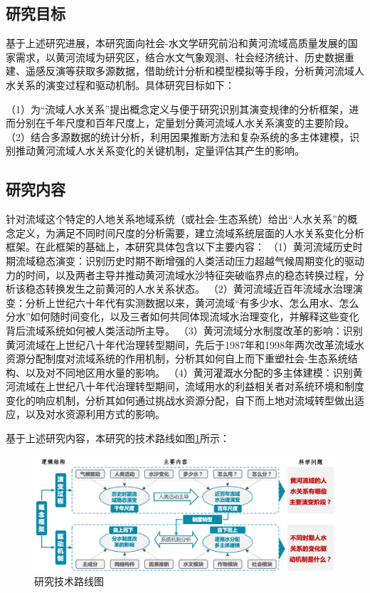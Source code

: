 
\subsection{研究目标}
基于上述研究进展，本研究面向社会-水文学研究前沿和黄河流域高质量发展的国家需求，以黄河流域为研究区，结合水文气象观测、社会经济统计、历史数据重建、遥感反演等获取多源数据，借助统计分析和模型模拟等手段，分析黄河流域人水关系的演变过程和驱动机制。具体研究目标如下：

（1）为“流域人水关系”提出概念定义与便于研究识别其演变规律的分析框架，进而分别在千年尺度和百年尺度上，定量划分黄河流域人水关系演变的主要阶段。
（2）结合多源数据的统计分析，利用因果推断方法和复杂系统的多主体建模，识别推动黄河流域人水关系变化的关键机制，定量评估其产生的影响。


\subsection{研究内容}

针对流域这个特定的人地关系地域系统（或社会-生态系统）给出“人水关系”的概念定义，为满足不同时间尺度的分析需要，建立流域系统层面的人水关系变化分析框架。在此框架的基础上，本研究具体包含以下主要内容：
（1）黄河流域历史时期流域稳态演变：识别历史时期不断增强的人类活动压力超越气候周期变化的驱动力的时间，以及两者主导并推动黄河流域水沙特征突破临界点的稳态转换过程，分析该稳态转换发生之前黄河的人水关系状态。
（2）黄河流域近百年流域水治理演变：分析上世纪六十年代有实测数据以来，黄河流域“有多少水、怎么用水、怎么分水”如何随时间变化，以及三者如何共同体现流域水治理变化，并解释这些变化背后流域系统如何被人类活动所主导。
（3）黄河流域分水制度改革的影响：识别黄河流域在上世纪八十年代治理转型期间，先后于1987年和1998年两次改革流域水资源分配制度对流域系统的作用机制，分析其如何自上而下重塑社会-生态系统结构、以及对不同地区用水量的影响。
（4）黄河灌溉水分配的多主体建模：识别黄河流域在上世纪八十年代治理转型期间，流域用水的利益相关者对系统环境和制度变化的响应机制，分析其如何通过挑战水资源分配，自下而上地对流域转型做出适应，以及对水资源利用方式的影响。

基于上述研究内容，本研究的技术路线如图\ref{ch1:fig:workflow}所示：

\begin{figure}[htb] %
    \includegraphics[width=\textwidth]{img/ch1/ch1_workflow.png}
    \caption{研究技术路线图}\label{ch1:fig:workflow}
\end{figure}

